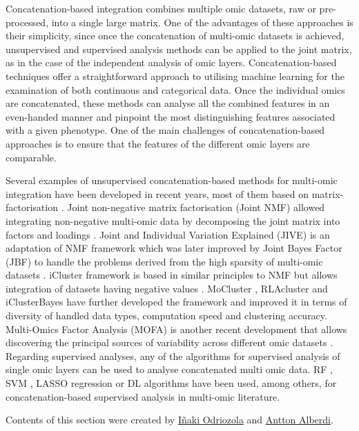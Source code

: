 \documentclass[
]{book}
\begin{document}
Concatenation-based integration combines multiple omic datasets, raw or pre-processed, into a single large matrix. One of the advantages of these approaches is their simplicity, since once the concatenation of multi-omic datasets is achieved, unsupervised and supervised analysis methods can be applied to the joint matrix, as in the case of the independent analysis of omic layers. Concatenation-based techniques offer a straightforward approach to utilising machine learning for the examination of both continuous and categorical data. Once the individual omics are concatenated, these methods can analyse all the combined features in an even-handed manner and pinpoint the most distinguishing features associated with a given phenotype. One of the main challenges of concatenation-based approaches is to ensure that the features of the different omic layers are comparable.

Several examples of unsupervised concatenation-based methods for multi-omic integration have been developed in recent years, most of them based on matrix-factorisation \citep{Reel2021-wb}. Joint non-negative matrix factorisation (Joint NMF) allowed integrating non-negative multi-omic data by decomposing the joint matrix into factors and loadings \citep{Zhang2021-sn}. Joint and Individual Variation Explained (JIVE) is an adaptation of NMF framework \citep{Lock2013-rq} which was later improved by Joint Bayes Factor (JBF) to handle the problems derived from the high sparsity of multi-omic datasets \citep{Ray2014-mn}. iCluster framework is based in similar principles to NMF but allows integration of datasets having negative values \citep{Shen2009-xr}. MoCluster \citep{Meng2016-hv}, RLAcluster \citep{Wu2015-qf} and iClusterBayes \citep{Mo2018-ty} have further developed the framework and improved it in terms of diversity of handled data types, computation speed and clustering accuracy. Multi-Omics Factor Analysis (MOFA) is another recent development that allows discovering the principal sources of variability across different omic datasets \citep{Argelaguet2018-dl}. Regarding supervised analyses, any of the algorithms for supervised analysis of single omic layers can be used to analyse concatenated multi omic data. RF \citep{Acharjee2016-uc}, SVM \citep{Li2017-qk}, LASSO regression \citep{Lee2017-bv} or DL \citep{Zhang2018-ty} algorithms have been used, among others, for concatenation-based supervised analysis in multi-omic literature.

Contents of this section were created by \protect\hyperlink{inaki-odriozola}{Iñaki Odriozola} and \protect\hyperlink{antton-alberdi}{Antton Alberdi}.
\end{document}
